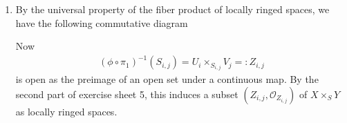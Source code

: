 \newcommand{\sheet}{6}




\maketitle{}

\begin{exercise}{1}
    \begin{enumerate}
        \item By the universal property of the fiber product of locally ringed spaces,
        we have the following commutative diagram
        \begin{center}
        \end{center}

    Now 
    \begin{align*}
        (\phi \circ \pi_1)^{-1}(S_{i,j})=U_i \times_{S_{i,j}} V_j  =: Z_{i,j}
    \end{align*}
    is open as the preimage of an open set under a continuous map. By the second 
    part of exercise sheet 5, this induces a subset $(Z_{i,j},\mathcal{O}_Z_{i,j})$ of $X \times_S Y$ 
    as locally ringed spaces.
    \end{enumerate}
\end{exercise}


